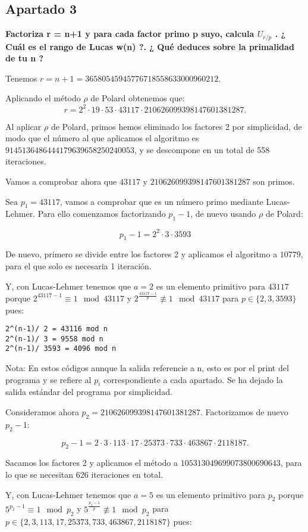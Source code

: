 \documentclass[a4paper]{article}
\begin{document}
\subsection{Apartado 3}

\textbf{Factoriza r = n+1 y para cada factor primo p suyo, calcula $U_{r/p}$ . ¿ Cuál es el rango de Lucas w(n) ?. ¿ Qué deduces sobre la primalidad de tu n ?}

Tenemos $r=n+1=36580545945776718558633000960212$.

Aplicando el método $\rho$ de Polard obtenemos que:
$$r=2^2\cdot 19\cdot 53\cdot 43117\cdot 210626099398147601381287.$$

Al aplicar $\rho$ de Polard, primos hemos eliminado los factores 2 por simplicidad, de modo que el número al que aplicamos el algoritmo es $9145136486444179639658250240053$, y se descompone en un total de 558 iteraciones.

Vamos a comprobar ahora que $43117$ y $210626099398147601381287$ son primos.

Sea $p_1=43117$, vamos a comprobar que es un número primo mediante Lucas-Lehmer. Para ello comenzamos factorizando $p_1-1$, de nuevo usando $\rho$ de Polard:

$$p_1-1=2^2\cdot 3\cdot 3593$$

De nuevo, primero se divide entre los factores 2 y aplicamos el algoritmo a $10779$, para el que solo es necesaria 1 iteración.

Y, con Lucas-Lehmer tenemos que $a=2$ es un elemento primitivo para $43117$ porque $2^{43117-1}\equiv 1\mod 43117$ y $2^{\frac{43117-1}{p}}\not\equiv 1\mod 43117 $ para $p\in\{2,3,3593\}$ pues:

\begin{verbatim}
2^(n-1)/ 2 = 43116 mod n
2^(n-1)/ 3 = 9558 mod n
2^(n-1)/ 3593 = 4096 mod n
\end{verbatim}
Nota: En estos códigos aunque la salida referencie a n, esto es por el print del programa y se refiere al $p_i$ correspondiente a cada apartado. Se ha dejado la salida estándar del programa por simplicidad.

Consideramos ahora $p_2=210626099398147601381287$. Factorizamos de nuevo $p_2-1$:

$$p_2-1=2\cdot 3\cdot 113\cdot 17\cdot 25373\cdot 733\cdot 463867\cdot 2118187.$$

Sacamos los factores 2 y aplicamos el método a $105313049699073800690643$, para lo que se necesitan 626 iteraciones en total.

Y, con Lucas-Lehmer tenemos que $a=5$ es un elemento primitivo para $p_2$ porque $5^{p_2-1}\equiv 1\mod p_2$ y $5^{\frac{p_2-1}{p}}\not\equiv 1\mod p_2 $ para $p\in\{2, 3, 113, 17, 25373, 733, 463867, 2118187\}$ pues:
\end{document}
